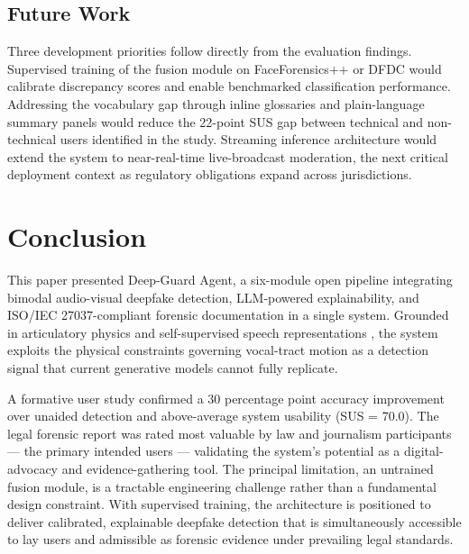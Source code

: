 \documentclass[12pt]{article}
\begin{document}
\subsection{Future Work}

Three development priorities follow directly from the evaluation findings.
Supervised training of the fusion module on FaceForensics++ \citep{rossler2019}
or DFDC would calibrate discrepancy scores and enable benchmarked classification
performance.
Addressing the vocabulary gap through inline glossaries and plain-language
summary panels would reduce the 22-point SUS gap between technical and
non-technical users identified in the study.
Streaming inference architecture would extend the system to near-real-time
live-broadcast moderation, the next critical deployment context as regulatory
obligations expand across jurisdictions.

\section{Conclusion}

This paper presented Deep-Guard Agent, a six-module open pipeline integrating
bimodal audio-visual deepfake detection, LLM-powered explainability, and
ISO/IEC 27037-compliant forensic documentation in a single system.
Grounded in articulatory physics and self-supervised speech representations
\citep{baevski2020,shi2022avhubert,wang2024artavdf}, the system exploits the
physical constraints governing vocal-tract motion as a detection signal that
current generative models cannot fully replicate.

A formative user study confirmed a 30 percentage point accuracy improvement over
unaided detection and above-average system usability (SUS = 70.0).
The legal forensic report was rated most valuable by law and journalism
participants --- the primary intended users --- validating the system's potential
as a digital-advocacy and evidence-gathering tool.
The principal limitation, an untrained fusion module, is a tractable engineering
challenge rather than a fundamental design constraint.
With supervised training, the architecture is positioned to deliver calibrated,
explainable deepfake detection that is simultaneously accessible to lay users
and admissible as forensic evidence under prevailing legal standards.


\end{document}

